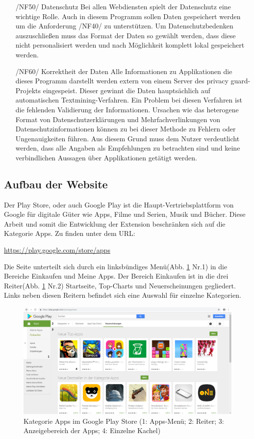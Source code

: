 \begin{itemize}
	\item[/NF50/] Datenschutz
	Bei allen Webdiensten spielt der Datenschutz eine wichtige Rolle. Auch in diesem Programm sollen Daten gespeichert werden um die Anforderung /NF40/ zu unterstützen. Um Datenschutzbedenken auszuschließen muss das Format der Daten so gewählt werden, dass diese nicht personalisiert werden und nach Möglichkeit komplett lokal gespeichert werden.
	\item[/NF60/] Korrektheit der Daten
	Alle Informationen zu Applikationen die dieses Programm darstellt werden extern von einem Server des privacy guard-Projekts eingespeist. Dieser gewinnt die Daten hauptsächlich auf automatischen Textmining-Verfahren. Ein Problem bei diesen Verfahren ist die fehlenden Validierung der Informationen. Ursachen wie das heterogene Format von Datenschutzerklärungen und Mehrfachverlinkungen von Datenschutzinformationen können zu bei dieser Methode zu Fehlern oder Ungenauigkeiten führen. Aus diesem Grund muss dem Nutzer verdeutlicht werden, dass alle Angaben als Empfehlungen zu betrachten sind und keine verbindlichen Aussagen über Applikationen getätigt werden.
\end{itemize}
\subsection{Aufbau der Website}
\label{ss:aufbauwebsite}

Der Play Store, oder auch \glqq Google Play\grqq{} ist die Haupt-Vertriebsplattform von Google für digitale Güter wie Apps, Filme und Serien, Musik und Bücher. Diese Arbeit und somit die Entwicklung der Extension beschränken sich auf die Kategorie \glqq Apps\grqq{}. Zu finden unter dem URL:

\glqq \url{https://play.google.com/store/apps}\grqq{}

Die Seite unterteilt sich durch ein linksbündiges Menü(Abb. \ref{playstore1} Nr.1) in die Bereiche \glqq Einkaufen\grqq{} und \glqq Meine Apps\grqq{}. Der Bereich \glqq Einkaufen\grqq{} ist in die drei Reiter(Abb. \ref{playstore1} Nr.2) \glqq Startseite\grqq{}, \glqq Top-Charts\grqq{} und \glqq Neuerscheinungen\grqq{} gegliedert. Links neben diesen Reitern befindet sich eine Auswahl für einzelne Kategorien.

\begin{figure}[ht]
	\centering
	\includegraphics[width=1\textwidth]{pics/playstore1num.png}
	\caption{Kategorie Apps im Google Play Store (1: Apps-Menü; 2: Reiter; 3: Anzeigebereich der Apps; 4: Einzelne Kachel)}
	\label{playstore1}
\end{figure}

